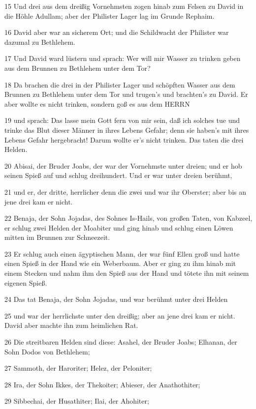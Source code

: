 \par 15 Und drei aus dem dreißig Vornehmsten zogen hinab zum Felsen zu David in die Höhle Adullam; aber der Philister Lager lag im Grunde Rephaim.
\par 16 David aber war an sicherem Ort; und die Schildwacht der Philister war dazumal zu Bethlehem.
\par 17 Und David ward lüstern und sprach: Wer will mir Wasser zu trinken geben aus dem Brunnen zu Bethlehem unter dem Tor?
\par 18 Da brachen die drei in der Philister Lager und schöpften Wasser aus dem Brunnen zu Bethlehem unter dem Tor und trugen's und brachten's zu David. Er aber wollte es nicht trinken, sondern goß es aus dem HERRN
\par 19 und sprach: Das lasse mein Gott fern von mir sein, daß ich solches tue und trinke das Blut dieser Männer in ihres Lebens Gefahr; denn sie haben's mit ihres Lebens Gefahr hergebracht! Darum wollte er's nicht trinken. Das taten die drei Helden.
\par 20 Abisai, der Bruder Joabs, der war der Vornehmste unter dreien; und er hob seinen Spieß auf und schlug dreihundert. Und er war unter dreien berühmt,
\par 21 und er, der dritte, herrlicher denn die zwei und war ihr Oberster; aber bis an jene drei kam er nicht.
\par 22 Benaja, der Sohn Jojadas, des Sohnes Is-Hails, von großen Taten, von Kabzeel, er schlug zwei Helden der Moabiter und ging hinab und schlug einen Löwen mitten im Brunnen zur Schneezeit.
\par 23 Er schlug auch einen ägyptischen Mann, der war fünf Ellen groß und hatte einen Spieß in der Hand wie ein Weberbaum. Aber er ging zu ihm hinab mit einem Stecken und nahm ihm den Spieß aus der Hand und tötete ihn mit seinem eigenen Spieß.
\par 24 Das tat Benaja, der Sohn Jojadas, und war berühmt unter drei Helden
\par 25 und war der herrlichste unter den dreißig; aber an jene drei kam er nicht. David aber machte ihn zum heimlichen Rat.
\par 26 Die streitbaren Helden sind diese: Asahel, der Bruder Joabs; Elhanan, der Sohn Dodos von Bethlehem;
\par 27 Sammoth, der Haroriter; Helez, der Peloniter;
\par 28 Ira, der Sohn Ikkes, der Thekoiter; Abieser, der Anathothiter;
\par 29 Sibbechai, der Husathiter; Ilai, der Ahohiter;
